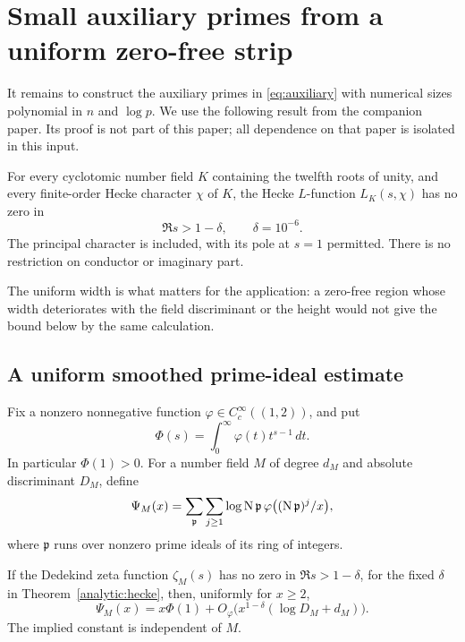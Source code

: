 \section{Small auxiliary primes from a uniform zero-free strip}
\label{sec:analytic}

It remains to construct the auxiliary primes in \eqref{eq:auxiliary}
with numerical sizes polynomial in $n$ and $\log p$. We use the following
result from the companion paper. Its proof is not part
of this paper; all dependence on that paper is isolated in this input.

\begin{theorem}\label{analytic:hecke}
For every cyclotomic number field $K$ containing the twelfth roots of
unity, and every finite-order Hecke character $\chi$ of $K$, the Hecke
$L$-function $L_K(s,\chi)$ has no zero in
\[
 \Re s>1-\delta,\qquad \delta=10^{-6}.
\]
The principal character is included, with its pole at $s=1$ permitted.
There is no restriction on conductor or imaginary part.
\end{theorem}

The uniform width is what matters for the application: a zero-free region whose
width deteriorates with the field discriminant or the height would not
give the bound below by the same calculation.

\subsection{A uniform smoothed prime-ideal estimate}

Fix a nonzero nonnegative function $\varphi\in C_c^\infty((1,2))$, and put
\[
 \Phi(s)=\int_0^\infty\varphi(t)t^{s-1}\,dt.
\]
In particular $\Phi(1)>0$. For a number field $M$ of degree $d_M$ and
absolute discriminant $D_M$, define
\[
 \Psi_M(x)=\sum_{\mathfrak p}\sum_{j\ge1}
 \log\operatorname{N}\mathfrak p\,
 \varphi\bigl((\operatorname{N}\mathfrak p)^j/x\bigr),
\]
where $\mathfrak p$ runs over nonzero prime ideals of its ring of integers.

\begin{lemma}\label{analytic:explicit}
If the Dedekind zeta function $\zeta_M(s)$ has no zero in
$\Re s>1-\delta$, for the fixed $\delta$ in
Theorem~\ref{analytic:hecke}, then, uniformly for $x\ge2$,
\begin{equation}\label{eq:smooth-prime}
 \Psi_M(x)=x\Phi(1)+
 O_\varphi\bigl(x^{1-\delta}(\log D_M+d_M)\bigr).
\end{equation}
The implied constant is independent of $M$.
\end{lemma}

